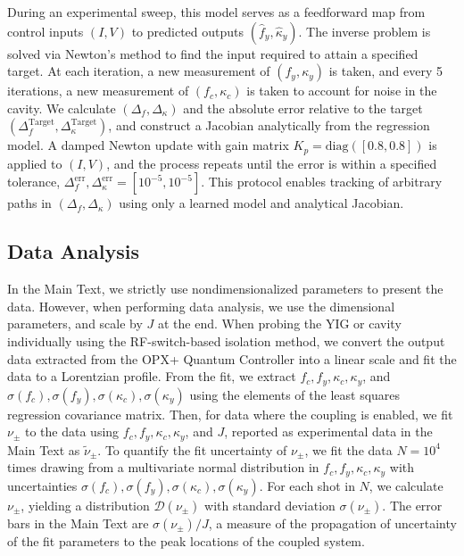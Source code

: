 \documentclass[%
  reprint,
  amsmath,amssymb,
  aps,
  prapplied,
  superscriptaddress,
  longbibliography]{revtex4-2}
\begin{document}
During an experimental sweep, this model serves as a feedforward map from control inputs $(I,V)$ to predicted outputs $(\hat{f}_y, \hat{\kappa}_y)$. The inverse problem is solved via Newton’s method to find the input required to attain a specified target. At each iteration, a new measurement of $(f_y, \kappa_y)$ is taken, and every 5 iterations, a new measurement of $(f_c, \kappa_c)$ is taken to account for noise in the cavity. We calculate $(\Delta_f, \Delta_\kappa)$ and the absolute error relative to the target $(\Delta_f^\text{Target}, \Delta_\kappa^\text{Target})$, and construct a Jacobian analytically from the regression model. A damped Newton update with gain matrix $K_p = \mathrm{diag}([0.8, 0.8])$ is applied to $(I,V)$, and the process repeats until the error is within a specified tolerance, $\Delta_f^\text{err}, \Delta_\kappa^\text{err} = [10^{-5}, 10^{-5}]$. This protocol enables tracking of arbitrary paths in $(\Delta_f, \Delta_\kappa)$ using only a learned model and analytical Jacobian. 

\subsection{\label{appendix-sec:methods-data-analysis} Data Analysis}

In the Main Text, we strictly use nondimensionalized parameters to present the data. However, when performing data analysis, we use the dimensional parameters, and scale by $J$ at the end. When probing the YIG or cavity individually using the RF-switch-based isolation method, we convert the output data extracted from the OPX+ Quantum Controller into a linear scale and fit the data to a Lorentzian profile. From the fit, we extract $f_c, f_y, \kappa_c, \kappa_y$, and $\sigma(f_c), \sigma(f_y), \sigma(\kappa_c), \sigma(\kappa_y)$ using the elements of the least squares regression covariance matrix. Then, for data where the coupling is enabled, we fit $\nu_\pm$ to the data using $f_c, f_y, \kappa_c, \kappa_y$, and $J$, reported as experimental data in the Main Text as $\tilde{\nu}_\pm$. To quantify the fit uncertainty of $\nu_\pm$, we fit the data $N = 10^4$ times drawing from a multivariate normal distribution in $f_c, f_y, \kappa_c, \kappa_y$ with uncertainties $\sigma(f_c), \sigma(f_y), \sigma(\kappa_c), \sigma(\kappa_y)$. For each shot in $N$, we calculate $\nu_\pm$, yielding a distribution $\mathcal{D}(\nu_\pm)$ with standard deviation $\sigma(\nu_\pm)$. The error bars in the Main Text are $\sigma(\nu_\pm)/J$, a measure of the propagation of uncertainty of the fit parameters to the peak locations of the coupled system. 
\end{document}
